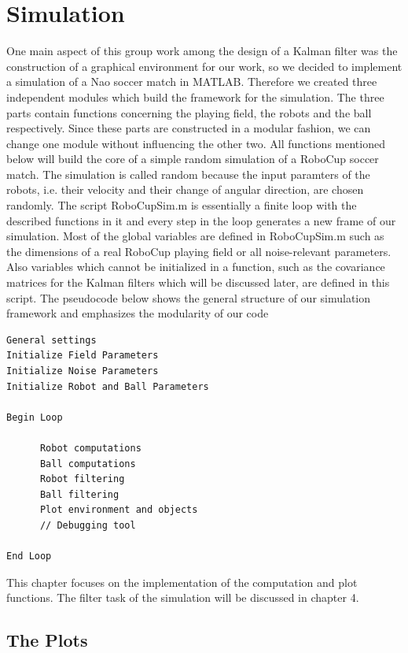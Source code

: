 
\chapter{Simulation}

One main aspect of this group work among the design of a Kalman filter was the construction of a graphical environment for our work, so we decided to implement a simulation of a Nao soccer match in MATLAB. Therefore we created three independent modules which build the framework for the simulation. The three parts contain functions concerning the playing field, the robots and the ball respectively. Since these parts are constructed in a modular fashion, we can change one module without influencing the other two. All functions mentioned below will build the core of a simple random simulation of a RoboCup soccer match. The simulation is called random because the input paramters of the robots, i.e. their velocity and their change of angular direction, are chosen randomly. The script {\selectfont RoboCupSim.m} is essentially a finite loop with the described functions in it and every step in the loop generates a new frame of our simulation. Most of the global variables are defined in {\selectfont RoboCupSim.m} such as the dimensions of a real RoboCup playing field or all noise-relevant parameters. Also variables which cannot be initialized in a function, such as the covariance matrices for the Kalman filters which will be discussed later, are defined in this script. The pseudocode below shows the general structure of our simulation framework and emphasizes the modularity of our code

\begin{verbatim}
General settings
Initialize Field Parameters
Initialize Noise Parameters
Initialize Robot and Ball Parameters

Begin Loop
	
      Robot computations
      Ball computations
      Robot filtering
      Ball filtering
      Plot environment and objects
      // Debugging tool
	
End Loop
\end{verbatim}

This chapter focuses on the implementation of the computation and plot functions. The filter task of the simulation will be discussed in chapter 4.


\section{The Plots}

